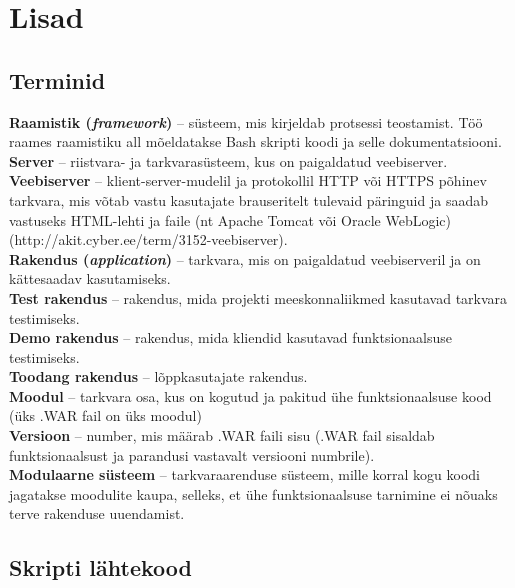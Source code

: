 \documentclass[12pt]{report}
\begin{document}
  \newpage
  
  \section*{Lisad}
  \label{lisad}
  
  \subsection{Terminid}
  
  \textbf{Raamistik (\textit{framework})} \--- süsteem, mis kirjeldab protsessi teostamist. Töö raames raamistiku all mõeldatakse Bash skripti koodi ja selle dokumentatsiooni.\\
  \textbf{Server} \--- riistvara- ja tarkvarasüsteem, kus on paigaldatud veebiserver.\\
  \textbf{Veebiserver} \--- klient-server-mudelil ja protokollil HTTP või HTTPS põhinev tarkvara, mis võtab vastu kasutajate brauseritelt tulevaid päringuid ja saadab vastuseks HTML-lehti ja faile (nt Apache Tomcat või Oracle WebLogic) (http://akit.cyber.ee/term/3152-veebiserver).\\
  \textbf{Rakendus (\textit{application})} \--- tarkvara, mis on paigaldatud veebiserveril ja on kättesaadav kasutamiseks.\\
  \textbf{Test rakendus} \--- rakendus, mida projekti meeskonnaliikmed kasutavad tarkvara testimiseks.\\
  \textbf{Demo rakendus} \--- rakendus, mida kliendid kasutavad funktsionaalsuse testimiseks.\\
  \textbf{Toodang rakendus} \--- lõppkasutajate rakendus.\\
  \textbf{Moodul} \--- tarkvara osa, kus on kogutud ja pakitud ühe funktsionaalsuse kood (üks .WAR fail on üks moodul)\\
  \textbf{Versioon} \--- number, mis määrab .WAR faili sisu (.WAR fail sisaldab funktsionaalsust ja parandusi vastavalt versiooni numbrile).\\
  \textbf{Modulaarne süsteem} \--- tarkvaraarenduse süsteem, mille korral kogu koodi jagatakse moodulite kaupa, selleks, et ühe funktsionaalsuse tarnimine ei nõuaks terve rakenduse uuendamist.\\
  
  \subsection{Skripti lähtekood}
  
\end{document}

